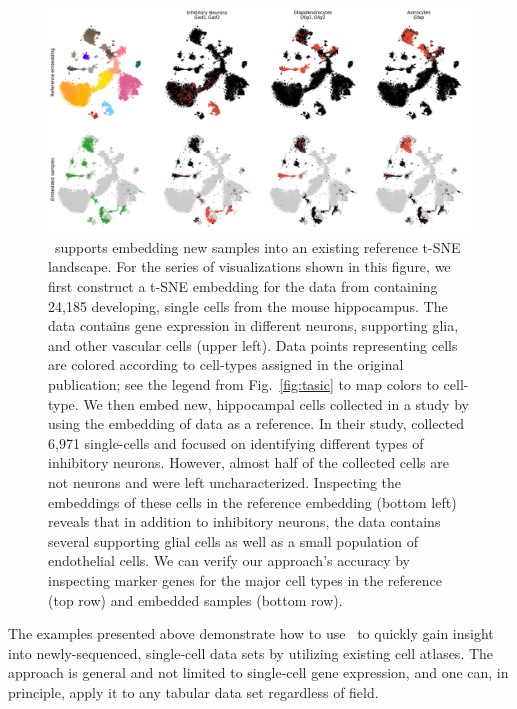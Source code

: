 \documentclass[article]{jss}
\newcommand{\opentsne}{\pkg{openTSNE}}
\begin{document}
\begin{figure}[htbp]
  \includegraphics[width=\textwidth]{transform_hochgerner}
  \caption{\label{fig:transform}
  \opentsne\ supports embedding new samples into an existing reference t-SNE
  landscape. For the series of visualizations shown in this figure, we
  first construct a t-SNE embedding for the data from 
  \citet{hochgerner2018conserved} containing 24,185
  developing, single cells from the mouse hippocampus. The data contains
  gene expression in different neurons, supporting glia, and other
  vascular cells (upper left). Data points representing cells are colored
  according to cell-types assigned in the original publication; see the
  legend from Fig.~\ref{fig:tasic} to map colors to cell-type. We then
  embed new, hippocampal cells collected in a study by
  \citet{harris2018classes} using the embedding of \citet{hochgerner2018conserved}
  data as a reference. In their study, \citet{harris2018classes}
  collected 6,971 single-cells and focused on identifying different
  types of inhibitory neurons. However, almost half of the collected cells
  are not neurons and were left uncharacterized. Inspecting the embeddings
  of these cells in the reference embedding (bottom left) reveals that in
  addition to inhibitory neurons, the data contains several supporting
  glial cells as well as a small population of endothelial cells. We can
  verify our approach's accuracy by inspecting marker genes for the major
  cell types in the reference (top row) and embedded samples (bottom row).
}
\end{figure}

The examples presented above demonstrate how to use \opentsne\ to quickly gain
insight into newly-sequenced, single-cell data sets by utilizing existing cell
atlases. The approach is general and not limited to single-cell gene expression,
and one can, in principle, apply it to any tabular data set regardless of field.
\end{document}
